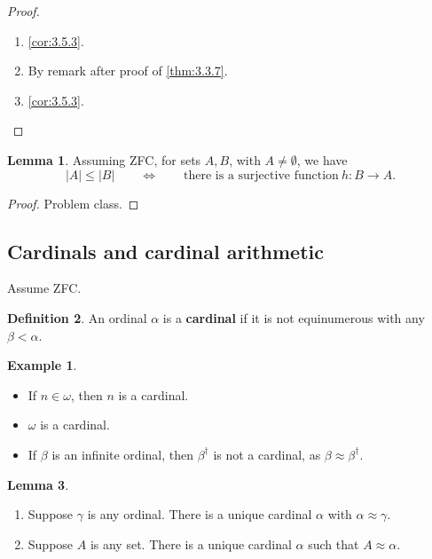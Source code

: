 \documentclass{article}
\newcommand{\abs}[1]{\left\lvert #1 \right\rvert}
\theoremstyle{definition}\newtheorem{definition}{Definition}[subsection]
\theoremstyle{definition}\newtheorem{remark1}[definition]{Remark}
\theoremstyle{definition}\newtheorem{example1}[definition]{Example}
\theoremstyle{definition}\newtheorem*{remark2}{Remark}
\theoremstyle{definition}\newtheorem*{example2}{Example}
\theoremstyle{definition}\newtheorem*{note}{Note}
\theoremstyle{definition}\newtheorem*{notation}{Notation}
\newtheorem{lemma}[definition]{Lemma}
\begin{document}
\begin{proof}
\hfill
\begin{enumerate}
\item \ref{cor:3.5.3}.
\item By remark after proof of \ref{thm:3.3.7}.
\item \ref{cor:3.5.3}.
\end{enumerate}
\end{proof}

\begin{lemma}
\label{lem:4.1.7}
Assuming ZFC, for sets $ A, B $, with $ A \ne \emptyset $, we have
$$ \abs{A} \le \abs{B} \qquad \iff \qquad \text{there is a surjective function} \ h : B \to A. $$
\end{lemma}

\begin{proof}
Problem class.
\end{proof}

\pagebreak

\subsection{Cardinals and cardinal arithmetic}

Assume ZFC.

\begin{definition}
An ordinal $ \alpha $ is a \textbf{cardinal} if it is not equinumerous with any $ \beta < \alpha $.
\end{definition}

\begin{example2}
\hfill
\begin{itemize}
\item If $ n \in \omega $, then $ n $ is a cardinal.
\item $ \omega $ is a cardinal.
\item If $ \beta $ is an infinite ordinal, then $ \beta^\dagger $ is not a cardinal, as $ \beta \approx \beta^\dagger $.
\end{itemize}
\end{example2}

\begin{lemma}
\hfill
\begin{enumerate}
\item Suppose $ \gamma $ is any ordinal. There is a unique cardinal $ \alpha $ with $ \alpha \approx \gamma $.
\item Suppose $ A $ is any set. There is a unique cardinal $ \alpha $ such that $ A \approx \alpha $.
\end{enumerate}
\end{lemma}
\end{document}
